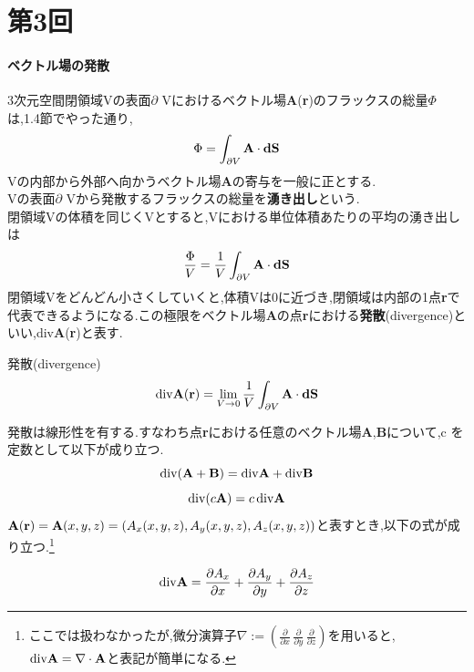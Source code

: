 \documentclass[../main]{subfiles}
\begin{document}
\clearpage

\setcounter{eqnarray}{0}
\setcounter{equation}{0}
\setcounter{figure}{0}

\part*{第3回}

\subsection{ベクトル場の発散}
3次元空間閉領域Vの表面$\partial$ Vにおけるベクトル場{\bf A}({\bf r})のフラックスの総量$\Phi$ は,1.4節でやった通り,
\begin{equation}
\Phi = \int_{\partial V}^{}{\bf A}\cdot{\bf dS}
\end{equation}
Vの内部から外部へ向かうベクトル場{\bf A}の寄与を一般に正とする.\\
Vの表面$\partial$ Vから発散するフラックスの総量を{\bf 湧き出し}という.\\
閉領域Vの体積を同じくVとすると,Vにおける単位体積あたりの平均の湧き出しは
\begin{equation}
\frac{\Phi}{V}=\frac{1}{V}\int_{\partial V}^{}{\bf A}\cdot {\bf dS}
\end{equation}
閉領域Vをどんどん小さくしていくと,体積Vは0に近づき,閉領域は内部の1点{\bf r}で代表できるようになる.この極限をベクトル場{\bf A}の点{\bf r}における{\bf 発散}(divergence)といい,div{\bf A}({\bf r})と表す.
\begin{itembox}[c]{発散(divergence)}
\begin{equation}
{\rm div}{\bf A}({\bf r})= \lim_{V \to 0}\frac{1}{V}\int_{\partial V}^{}{\bf A}\cdot {\bf dS}
\end{equation}
\end{itembox}

発散は線形性を有する.すなわち点{\bf r}における任意のベクトル場{\bf A},{\bf B}について,c	を定数として以下が成り立つ.
\begin{equation}
{\rm div}({\bf A}+{\bf B})={\rm div}{\bf A}+{\rm div}{\bf B}
\end{equation}
\begin{equation}
{\rm div}(c{\bf A})=c\,{\rm div}{\bf A}
\end{equation}
${\bf A}({\bf r})={\bf A}(x,y,z)=(A_x(x,y,z),A_y(x,y,z),A_z(x,y,z))$と表すとき,以下の式が成り立つ.\footnote{ここでは扱わなかったが,微分演算子$\nabla:=\left( \frac{\partial}{\partial x} \, \frac{\partial}{\partial y} \, \frac{\partial}{\partial z} \right) $を用いると, ${\rm div}{\bf A}=\nabla \cdot {\bf A}$と表記が簡単になる.}
\begin{itembox}[c]{}
\begin{equation}
{\rm div}{\bf A}=\frac{\partial A_x}{\partial x}+\frac{\partial A_y}{\partial y}+\frac{\partial A_z}{\partial z}
\end{equation}
\end{itembox}
\end{document}
